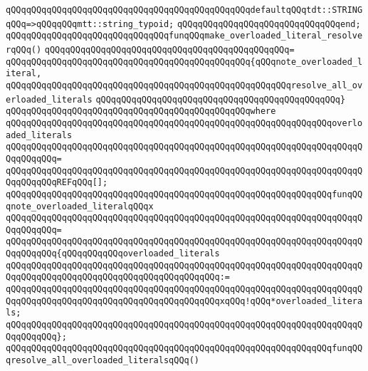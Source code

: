 \verb|qQQqqQQqqQQqqQQqqQQqqQQqqQQqqQQqqQQqqQQqqQQqqQQqdefaultqQQqtdt::STRINGqQQq=>qQQqqQQqmtt::string_typoid;|\newline
\verb|qQQqqQQqqQQqqQQqqQQqqQQqqQQqqQQqend;|\newline
\newline
\verb|qQQqqQQqqQQqqQQqqQQqqQQqqQQqqQQqfunqQQqmake_overloaded_literal_resolverqQQq()|\newline
\verb|qQQqqQQqqQQqqQQqqQQqqQQqqQQqqQQqqQQqqQQqqQQqqQQq=|\newline
\verb|qQQqqQQqqQQqqQQqqQQqqQQqqQQqqQQqqQQqqQQqqQQqqQQq{qQQqnote_overloaded_literal,|\newline
\verb|qQQqqQQqqQQqqQQqqQQqqQQqqQQqqQQqqQQqqQQqqQQqqQQqqQQqqQQqresolve_all_overloaded_literals|\newline
\verb|qQQqqQQqqQQqqQQqqQQqqQQqqQQqqQQqqQQqqQQqqQQqqQQq}|\newline
\verb|qQQqqQQqqQQqqQQqqQQqqQQqqQQqqQQqqQQqqQQqqQQqqQQqwhere|\newline
\verb|qQQqqQQqqQQqqQQqqQQqqQQqqQQqqQQqqQQqqQQqqQQqqQQqqQQqqQQqqQQqqQQqoverloaded_literals|\newline
\verb|qQQqqQQqqQQqqQQqqQQqqQQqqQQqqQQqqQQqqQQqqQQqqQQqqQQqqQQqqQQqqQQqqQQqqQQqqQQqqQQq=|\newline
\verb|qQQqqQQqqQQqqQQqqQQqqQQqqQQqqQQqqQQqqQQqqQQqqQQqqQQqqQQqqQQqqQQqqQQqqQQqqQQqqQQqREFqQQq[];|\newline
\newline
\verb|qQQqqQQqqQQqqQQqqQQqqQQqqQQqqQQqqQQqqQQqqQQqqQQqqQQqqQQqqQQqqQQqfunqQQqnote_overloaded_literalqQQqx|\newline
\verb|qQQqqQQqqQQqqQQqqQQqqQQqqQQqqQQqqQQqqQQqqQQqqQQqqQQqqQQqqQQqqQQqqQQqqQQqqQQqqQQq=|\newline
\verb|qQQqqQQqqQQqqQQqqQQqqQQqqQQqqQQqqQQqqQQqqQQqqQQqqQQqqQQqqQQqqQQqqQQqqQQqqQQqqQQq{qQQqqQQqqQQqoverloaded_literals|\newline
\verb|qQQqqQQqqQQqqQQqqQQqqQQqqQQqqQQqqQQqqQQqqQQqqQQqqQQqqQQqqQQqqQQqqQQqqQQqqQQqqQQqqQQqqQQqqQQqqQQqqQQqqQQqqQQqqQQq:=|\newline
\verb|qQQqqQQqqQQqqQQqqQQqqQQqqQQqqQQqqQQqqQQqqQQqqQQqqQQqqQQqqQQqqQQqqQQqqQQqqQQqqQQqqQQqqQQqqQQqqQQqqQQqqQQqqQQqqQQqxqQQq!qQQq*overloaded_literals;|\newline
\verb|qQQqqQQqqQQqqQQqqQQqqQQqqQQqqQQqqQQqqQQqqQQqqQQqqQQqqQQqqQQqqQQqqQQqqQQqqQQqqQQq};|\newline
\newline
\verb|qQQqqQQqqQQqqQQqqQQqqQQqqQQqqQQqqQQqqQQqqQQqqQQqqQQqqQQqqQQqqQQqfunqQQqresolve_all_overloaded_literalsqQQq()|\newline
